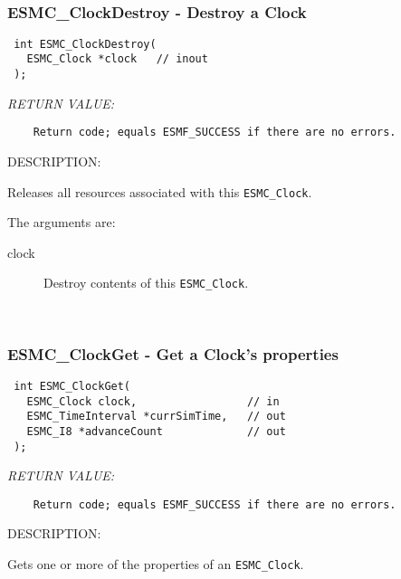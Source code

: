  
\mbox{}\hrulefill\ 
 
\subsubsection [ESMC\_ClockDestroy] {ESMC\_ClockDestroy - Destroy a Clock}


  
\begin{verbatim} int ESMC_ClockDestroy(
   ESMC_Clock *clock   // inout
 );
 \end{verbatim}{\em RETURN VALUE:}
\begin{verbatim}    Return code; equals ESMF_SUCCESS if there are no errors.\end{verbatim}
{\sf DESCRIPTION:\\ }


  
    Releases all resources associated with this {\tt ESMC\_Clock}.
  
    The arguments are:
    \begin{description}
    \item[clock]
      Destroy contents of this {\tt ESMC\_Clock}.
    \end{description}
   
 
\mbox{}\hrulefill\ 
 
\subsubsection [ESMC\_ClockGet] {ESMC\_ClockGet - Get a Clock's properties}


  
\begin{verbatim} int ESMC_ClockGet(
   ESMC_Clock clock,                 // in
   ESMC_TimeInterval *currSimTime,   // out
   ESMC_I8 *advanceCount             // out
 );
 \end{verbatim}{\em RETURN VALUE:}
\begin{verbatim}    Return code; equals ESMF_SUCCESS if there are no errors.\end{verbatim}
{\sf DESCRIPTION:\\ }


  
   Gets one or more of the properties of an {\tt ESMC\_Clock}.
  
